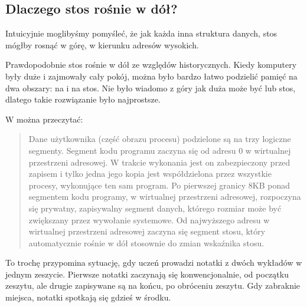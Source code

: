 \subsection{Dlaczego stos rośnie w dół?}
\label{stack_grow_backwards}

Intuicyjnie moglibyśmy pomyśleć, że jak każda inna struktura danych, stos mógłby rosnąć w górę, w kierunku adresów wysokich.

Prawdopodobnie stos rośnie w dół ze względów historycznych.
Kiedy komputery były duże i zajmowały cały pokój, można było bardzo łatwo podzielić pamięć na dwa obszary: na  i na stos.
Nie było wiadomo z góry jak duża może być  lub stos, dlatego takie rozwiązanie było najprostsze.



W \RitchieThompsonUNIX można przeczytać:

\begin{framed}
\begin{quotation}
Dane użytkownika (część obrazu procesu) podzielone są na trzy logiczne segmenty.
Segment kodu programu zaczyna się od adresu 0 w wirtualnej przestrzeni adresowej.
W trakcie wykonania jest on zabezpieczony przed zapisem i tylko jedna jego kopia jest współdzielona przez wszystkie procesy, wykonujące ten sam program.
Po pierwszej granicy 8KB ponad segmentem kodu programy, w wirtualnej przestrzeni adresowej, rozpoczyna się prywatny, zapisywalny segment danych, którego rozmiar może być zwiększany przez wywołanie systemowe.
Od najwyższego adresu w wirtualnej przestrzeni adresowej zaczyna się segment stosu, który automatycznie rośnie w dół stosownie do zmian wskaźnika stosu.
\end{quotation}
\end{framed}

To trochę przypomina sytuację, gdy uczeń prowadzi notatki z dwóch wykładów w jednym zeszycie. Pierwsze notatki zaczynają się konwencjonalnie, od początku zeszytu, ale drugie zapisywane są na końcu, po obróceniu zeszytu. Gdy zabraknie miejsca, notatki spotkają się gdzieś w środku.


